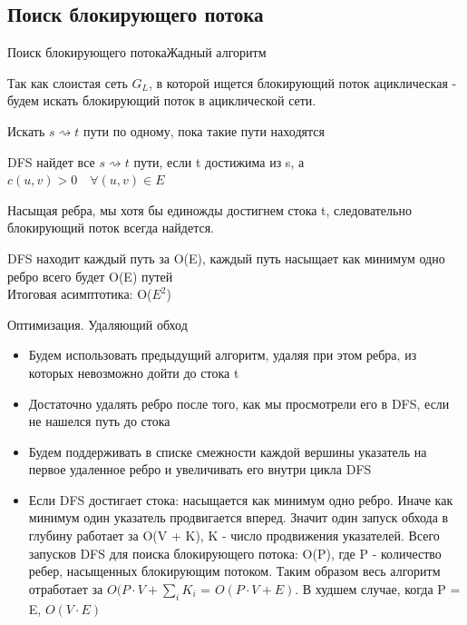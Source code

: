 \documentclass{beamer}
\begin{document}
\subsection{Поиск блокирующего потока}
\begin{frame}{Поиск блокирующего потока}{Жадный алгоритм}
    \begin{itemize}
        \item {
            Так как слоистая сеть $G_{L}$, в которой ищется блокирующий поток ациклическая - будем искать блокирующий поток в ациклической сети.
        }
        \item Искать $s \rightsquigarrow t$ пути по одному, пока такие пути находятся
        \item DFS найдет все $s \rightsquigarrow t$ пути, если t достижима из s, а $c(u, v) > 0 \quad \forall (u, v) \in E$
        \item { Насыщая ребра, мы хотя бы единожды достигнем стока t, следовательно блокирующий поток всегда найдется. 
        \item DFS находит каждый путь за O(E), каждый путь насыщает как минимум одно ребро \Rightarrow всего будет O(E) путей\\
        Итоговая асимптотика: O($E^2$)
        }
    \end{itemize}
\end {frame}

\begin{frame}{Оптимизация. Удаляющий обход}
    \begin{itemize}
        \item Будем использовать предыдущий алгоритм, удаляя при этом ребра, из которых невозможно дойти до стока t
        \pause
        \item Достаточно удалять ребро после того, как мы просмотрели его в DFS, если не нашелся путь до стока
        \pause
        \item Будем поддерживать в списке смежности каждой вершины указатель на первое удаленное ребро и увеличивать его внутри цикла DFS
        \pause
        \item Если DFS достигает стока: насыщается как минимум одно ребро. Иначе как минимум один указатель продвигается вперед. Значит один запуск обхода в глубину работает за O(V + K), K - число продвижения указателей. 
        Всего запусков DFS для поиска блокирующего потока: O(P), где P - количество ребер, насыщенных блокирующим потоком.
        Таким образом весь алгоритм отработает за $O(P \cdot V + \sum_{i} K_{i} $ = $O(P \cdot V + E)$. В худшем случае, когда P = E, $O(V \cdot E)$
    \end{itemize}
\end{frame}
\begin{enumerate}
\end{enumerate}
\end{document}
